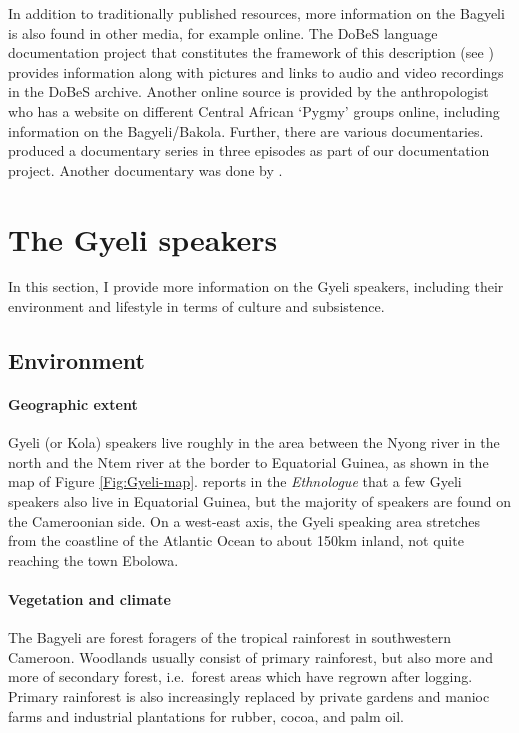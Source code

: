 In addition to traditionally published resources, more information on the Bagyeli is also found in other media, for example online. The DoBeS language documentation project that constitutes the framework of this description (see ) provides information along with pictures and links to audio and video recordings in the DoBeS archive.  Another online source is provided by the anthropologist \citet{devin2015} who has a website on different Central African `Pygmy' groups online, including information on the Bagyeli/Bakola. Further, there are various documentaries. \citet{lorenz2014} produced a documentary series in three episodes as part of our documentation project. Another documentary was done by \citet{thomopoulos2012}. %





\section{The Gyeli speakers}
\label{sec:GyeliSp}

In this section, I provide more information on the Gyeli speakers, including their environment and lifestyle in terms of culture and subsistence.

\subsection{Environment}
\label{sec:Environ}

\paragraph{Geographic extent} Gyeli (or Kola) speakers live roughly in the area between the Nyong river in the north and the Ntem river at the border to Equatorial Guinea, as shown in the map of Figure \ref{Fig:Gyeli-map}. \citet{lewis09} reports in the {\itshape Ethnologue} that a few Gyeli speakers also live in Equatorial Guinea, but the majority of speakers are found on the  Cameroonian side.
On a west-east axis, the Gyeli speaking area stretches from the coastline of the Atlantic Ocean to about 150km inland, not quite reaching the town Ebolowa. 

\paragraph{Vegetation and climate} The Bagyeli are forest foragers of the tropical rainforest in southwestern Cameroon. Woodlands usually consist of primary rainforest, but also more and more of secondary forest, i.e.\ forest areas which have regrown after logging.
Primary rainforest is also increasingly replaced by private gardens and manioc farms and industrial plantations for rubber, cocoa, and palm oil.

